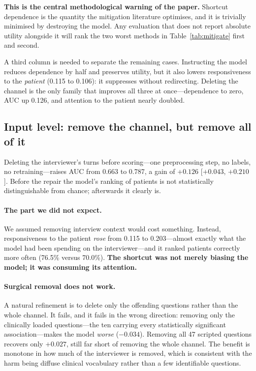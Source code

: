 \documentclass{article}
\begin{document}
\textbf{This is the central methodological warning of the paper.} Shortcut
dependence is the quantity the mitigation literature optimises, and it is
trivially minimised by destroying the model. Any evaluation that does not report
absolute utility alongside it will rank the two worst methods in
Table~\ref{tab:mitigate} first and second.

A third column is needed to separate the remaining cases. Instructing the model
reduces dependence by half and preserves utility, but it also lowers
responsiveness to the \emph{patient} (0.115 to 0.106): it suppresses without
redirecting. Deleting the channel is the only family that improves all three at
once---dependence to zero, AUC up 0.126, and attention to the patient nearly
doubled.

\subsection{Input level: remove the channel, but remove all of it}

Deleting the interviewer's turns before scoring---one preprocessing step, no
labels, no retraining---raises AUC from 0.663 to 0.787, a gain of $+0.126$
[$+0.043$, $+0.210$]. Before the repair the model's ranking of patients is not
statistically distinguishable from chance; afterwards it clearly is.

\paragraph{The part we did not expect.} We assumed removing interview context
would cost something. Instead, responsiveness to the patient \emph{rose} from
0.115 to 0.203---almost exactly what the model had been spending on the
interviewer---and it ranked patients correctly more often (76.5\% versus
70.0\%). \textbf{The shortcut was not merely biasing the model; it was consuming
its attention.}

\paragraph{Surgical removal does not work.} A natural refinement is to delete
only the offending questions rather than the whole channel. It fails, and it
fails in the wrong direction: removing only the clinically loaded questions---the
ten carrying every statistically significant association---makes the model
\emph{worse} ($-0.034$). Removing all 47 scripted questions recovers only
$+0.027$, still far short of removing the whole channel. The benefit is
monotone in how much of the interviewer is removed, which is consistent with the
harm being diffuse clinical vocabulary rather than a few identifiable questions.
\end{document}
